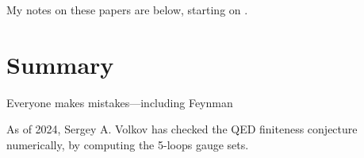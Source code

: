 My notes on these papers are below, starting on .


\section{Summary}
\label{sect:Summary}

\begin{bartlett}{
{Everyone makes mistakes—including {Feynman}}
        }
\end{bartlett}
\bigskip

\noindent
As of 2024, Sergey  A. Volkov has checked the QED finiteness conjecture 
numerically, by computing the 5-loops gauge sets. 

